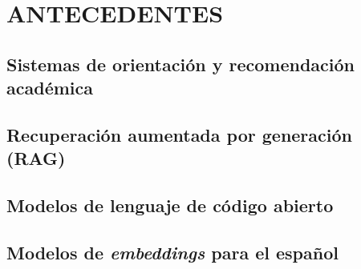 \chapter{ANTECEDENTES}


\section{Sistemas de orientación y recomendación académica}


\section{Recuperación aumentada por generación (RAG)}


\section{Modelos de lenguaje de código abierto}


\section{Modelos de \textit{embeddings} para el español}


